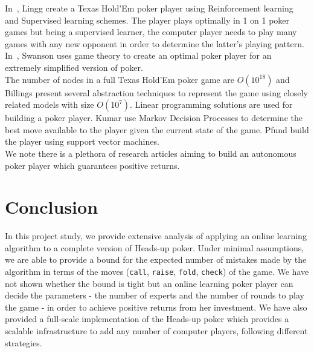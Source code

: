 \documentclass[12pt]{article}
\begin{document}
\noindent In~\cite{stanford-report}, Lingg \etal create a Texas Hold'Em poker player using Reinforcement learning and Supervised learning schemes.
The player plays optimally in 1 on 1 poker games but being a supervised learner, the computer player needs to play many games with any
new opponent in order to determine the latter's playing pattern. In~\cite{swanson2005game}, Swanson \etal uses game theory to
create an optimal poker player for an extremely simplified version of poker.\\

\noindent The number of nodes in a full Texas Hold'Em poker game are $O(10^{18})$ and Billings \etal\cite{billings2003approximating} present
several abstraction techniques to represent the game using closely related models with size $O(10^7)$. Linear programming solutions are used for
building a poker player. Kumar \etal\cite{stanford-mdp} use Markov Decision Processes to determine the best move available to the player
given the current state of the game. Pfund \etal\cite{upenn-svm} build the player using support vector machines.\\

\noindent We note there is a plethora of research articles aiming to build an autonomous poker player which guarantees positive returns.

\section{Conclusion}
\label{sec:conclusion}
\noindent In this project study, we provide extensive analysis of applying an online learning algorithm to a complete version of Heads-up poker. Under
minimal assumptions, we are able to provide a bound for the expected number of mistakes made by the algorithm in terms of the moves (\texttt{call},
\texttt{raise}, \texttt{fold}, \texttt{check}) of the game. We have not shown whether the bound is tight but an online learning poker player
can decide the parameters - the number of experts and the number of rounds to play the game - in order to achieve positive returns from her investment.
We have also provided a full-scale implementation of the Heads-up poker which provides a scalable infrastructure to add any number of computer players,
following different strategies.
\end{document}
